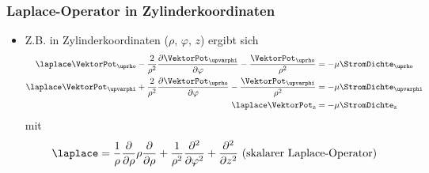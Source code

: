 \begin{frame}
  \frametitle{Laplace-Operator in Zylinderkoordinaten}
  \begin{itemize}[<+->]
  \item Z.B. in Zylinderkoordinaten (\(\rho,\,\varphi,\,z \)) ergibt sich 
\begin{align*}
	\laplace \VektorPot_{\uprho} - \dfrac{2}{\rho^2} \dfrac{\partial \VektorPot_{\upvarphi}}{\partial \varphi} - \dfrac{\VektorPot_{\uprho}}{\rho^2} &= -\mu \StromDichte_{\uprho} \\
	\laplace \VektorPot_{\upvarphi} + \dfrac{2}{\rho^2}  \dfrac{\partial \VektorPot_{\uprho}}{\partial \varphi} - \dfrac{\VektorPot_{\upvarphi}}{\rho^2} &= -\mu \StromDichte_{\upvarphi} \\
	\laplace \VektorPot_\mathrm{z} &= -\mu  \StromDichte_\mathrm{z}
\end{align*}
mit
\begin{equation*}
	\laplace = \dfrac{1}{\rho} \dfrac{\partial}{\partial \rho} \rho \dfrac{\partial}{\partial \rho} + \dfrac{1}{\rho^2} \dfrac{\partial^2}{\partial \varphi^2} + \dfrac{\partial^2}{\partial z^2} \text{ (skalarer Laplace-Operator)}
\end{equation*}
  \end{itemize}
\end{frame}

